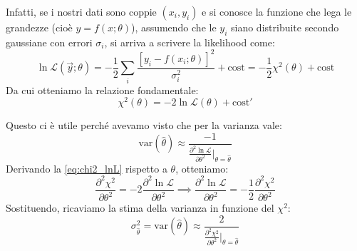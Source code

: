 \documentclass[openany,a4paper,12pt]{book}
\theoremstyle{remark}
\begin{document}
Infatti, se i nostri dati sono coppie $(x_i, y_i)$ e si conosce la funzione che lega le grandezze (cioè $y = f(x; \theta)$), assumendo che le $y_i$ siano distribuite secondo gaussiane con errori $\sigma_i$, si arriva a scrivere la likelihood come:
\begin{equation}
    \ln \mathcal{L}(\vec{y}; \theta) = -\frac{1}{2} \sum_i \frac{[y_i - f(x_i; \theta)]^2}{\sigma_i^2} + \text{cost} = -\frac{1}{2} \chi^2(\theta) + \text{cost}
\end{equation}
Da cui otteniamo la relazione fondamentale:
\begin{equation} \label{eq:chi2_lnL}
    \chi^2(\theta) = -2 \ln \mathcal{L}(\theta) + \text{cost}'
\end{equation}

Questo ci è utile perché avevamo visto che per la varianza vale:
\begin{equation}
    \text{var}(\hat{\theta}) \approx \frac{-1}{\frac{\partial^2 \ln \mathcal{L}}{\partial \theta^2}\bigg|_{\theta = \hat{\theta}}}
\end{equation}
Derivando la \eqref{eq:chi2_lnL} rispetto a $\theta$, otteniamo:
\begin{equation}
    \frac{\partial^2 \chi^2}{\partial \theta^2} = -2 \frac{\partial^2 \ln \mathcal{L}}{\partial \theta^2} \implies \frac{\partial^2 \ln \mathcal{L}}{\partial \theta^2} = -\frac{1}{2} \frac{\partial^2 \chi^2}{\partial \theta^2}
\end{equation}
Sostituendo, ricaviamo la stima della varianza in funzione del $\chi^2$:
\begin{equation}
    \sigma_{\hat{\theta}}^2 = \text{var}(\hat{\theta}) \approx \frac{2}{\frac{\partial^2 \chi^2}{\partial \theta^2}\bigg|_{\theta = \hat{\theta}}}
\end{equation}
\end{document}
